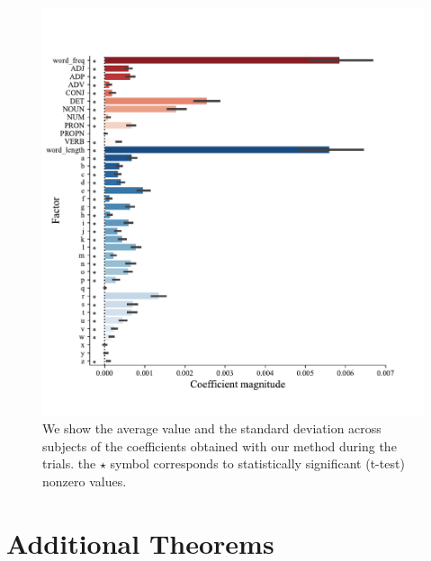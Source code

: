 \documentclass{article}
\begin{document}
\begin{figure}[h]
  \centering
  \includegraphics[width=\textwidth, trim=0cm 0cm 0cm 0cm]{figures/pvalues_vertical.pdf}
  \caption{We show the average value and the standard deviation across subjects of the coefficients obtained with our method during the trials. the $\star$  symbol corresponds to statistically significant (t-test) nonzero values.}
  \label{fig:ridgebaselineresult}
\end{figure}

\clearpage
\newpage

\section{Additional Theorems}
\end{document}
